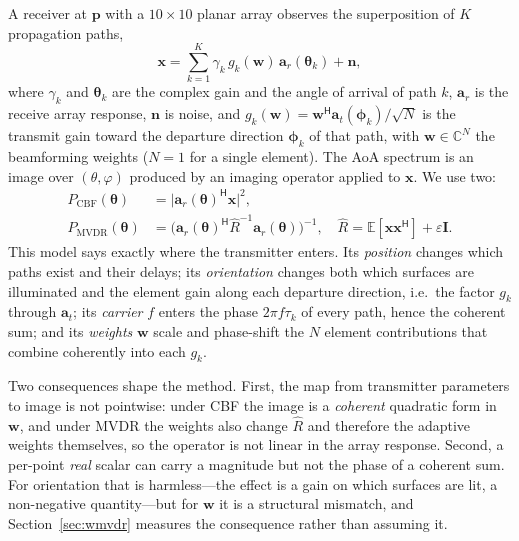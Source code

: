 \documentclass[conference]{IEEEtran}
\begin{document}
A receiver at $\mathbf{p}$ with a $10\times10$ planar array observes the
superposition of $K$ propagation paths,
\begin{equation}
\mathbf{x}=\sum_{k=1}^{K}\gamma_k\,g_k(\mathbf{w})\,
\mathbf{a}_r(\boldsymbol{\theta}_k)+\mathbf{n},
\end{equation}
where $\gamma_k$ and $\boldsymbol{\theta}_k$ are the complex gain and the
angle of arrival of path $k$, $\mathbf{a}_r$ is the receive array response,
$\mathbf{n}$ is noise, and $g_k(\mathbf{w})=\mathbf{w}^{\mathsf{H}}
\mathbf{a}_t(\boldsymbol{\phi}_k)/\sqrt{N}$ is the transmit gain toward the
departure direction $\boldsymbol{\phi}_k$ of that path, with
$\mathbf{w}\in\mathbb{C}^{N}$ the beamforming weights ($N=1$ for a single
element). The AoA spectrum is an image over $(\theta,\varphi)$ produced by an
imaging operator applied to $\mathbf{x}$. We use two:
\begin{align}
P_{\mathrm{CBF}}(\boldsymbol{\theta})&=\bigl|\mathbf{a}_r(\boldsymbol{\theta})^{\mathsf{H}}\mathbf{x}\bigr|^2,\\
P_{\mathrm{MVDR}}(\boldsymbol{\theta})&=\bigl(\mathbf{a}_r(\boldsymbol{\theta})^{\mathsf{H}}
\hat{R}^{-1}\mathbf{a}_r(\boldsymbol{\theta})\bigr)^{-1},\quad
\hat{R}=\mathbb{E}[\mathbf{x}\mathbf{x}^{\mathsf{H}}]+\varepsilon\mathbf{I}.
\end{align}
This model says exactly where the transmitter enters. Its \emph{position}
changes which paths exist and their delays; its \emph{orientation} changes both
which surfaces are illuminated and the element gain along each departure
direction, i.e.\ the factor $g_k$ through $\mathbf{a}_t$; its \emph{carrier}
$f$ enters the phase $2\pi f\tau_k$ of every path, hence the coherent sum; and
its \emph{weights} $\mathbf{w}$ scale and phase-shift the $N$ element
contributions that combine coherently into each $g_k$.

Two consequences shape the method. First, the map from transmitter parameters
to image is not pointwise: under CBF the image is a \emph{coherent} quadratic
form in $\mathbf{w}$, and under MVDR the weights also change $\hat{R}$ and
therefore the adaptive weights themselves, so the operator is not linear in the
array response. Second, a per-point \emph{real} scalar can carry a magnitude
but not the phase of a coherent sum. For orientation that is harmless---the
effect is a gain on which surfaces are lit, a non-negative quantity---but for
$\mathbf{w}$ it is a structural mismatch, and Section~\ref{sec:wmvdr} measures
the consequence rather than assuming it.
\end{document}
